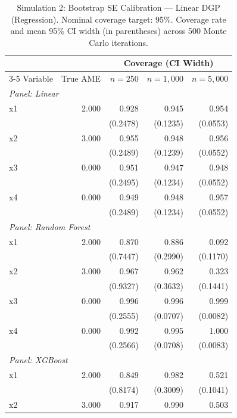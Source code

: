 \documentclass[12pt]{article}
\begin{document}
	\begin{table}[htbp]
		\centering
		\footnotesize
		\begin{threeparttable}
			\caption{Simulation 2: Bootstrap SE Calibration --- Linear DGP (Regression). Nominal coverage target: 95\%. Coverage rate and mean 95\% CI width (in parentheses) across 500 Monte Carlo iterations.}
			\label{tab:sim2_calibration_regression_linear}
			\begin{tabular}{lrrrr}
				\toprule
				& & \multicolumn{3}{c}{Coverage (CI Width)} \\
				\cmidrule(lr){3-5}
				Variable & True AME & $n=250$ & $n=1,000$ & $n=5,000$ \\
				\midrule
				\multicolumn{5}{l}{\textit{Panel: Linear}} \\
				\quad x1 & 2.000 & 0.928 & 0.945 & 0.954 \\
				&  & (0.2478) & (0.1235) & (0.0553) \\
				\quad x2 & 3.000 & 0.955 & 0.948 & 0.956 \\
				&  & (0.2489) & (0.1239) & (0.0552) \\
				\quad x3 & 0.000 & 0.951 & 0.947 & 0.948 \\
				&  & (0.2495) & (0.1234) & (0.0552) \\
				\quad x4 & 0.000 & 0.949 & 0.948 & 0.957 \\
				&  & (0.2489) & (0.1234) & (0.0552) \\
				\midrule
				\multicolumn{5}{l}{\textit{Panel: Random Forest}} \\
				\quad x1 & 2.000 & 0.870 & 0.886 & 0.092 \\
				&  & (0.7447) & (0.2990) & (0.1170) \\
				\quad x2 & 3.000 & 0.967 & 0.962 & 0.323 \\
				&  & (0.9327) & (0.3632) & (0.1441) \\
				\quad x3 & 0.000 & 0.996 & 0.996 & 0.999 \\
				&  & (0.2555) & (0.0707) & (0.0082) \\
				\quad x4 & 0.000 & 0.992 & 0.995 & 1.000 \\
				&  & (0.2566) & (0.0708) & (0.0083) \\
				\midrule
				\multicolumn{5}{l}{\textit{Panel: XGBoost}} \\
				\quad x1 & 2.000 & 0.849 & 0.982 & 0.521 \\
				&  & (0.8174) & (0.3009) & (0.1041) \\
				\quad x2 & 3.000 & 0.917 & 0.990 & 0.503 \\

\end{tabular}
\end{threeparttable}
\end{table}
\end{document}
